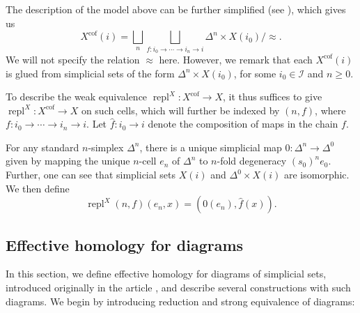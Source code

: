 \documentclass[12pt,a4wide]{article}
\theoremstyle{plain}
\theoremstyle{definition}
\newcommand{\cofr}{\mathrm{cof}}
\newcommand{\repl}{\mathop\mathrm{repl}}
\newcommand{\stdsimp}[1]{\Delta^{#1}}
\renewcommand\:{\colon}
\newcommand{\dX}{X}
\newcommand{\icat}{\mathcal I}
\begin{document}
The description of the model above can be further simplified (see \cite{dugger}), which gives us
\[
\dX^{\cofr} (i) = \bigsqcup_{n} \bigsqcup_{f\:i_0\to \cdots \to i_n\to i} \stdsimp{n} \times \dX(i_0)  / {\approx}.
\]
We will not specify the relation $\approx$ here. However, we remark that each $\dX^{\cofr} (i)$ is glued from simplicial sets of the form $\stdsimp{n} \times \dX(i_0)$, for some $i_0 \in \icat$ and $n \geq 0$. 

To describe the weak equivalence $\repl^{\dX}\:\dX^\cofr \to \dX$, it thus suffices to give  $\repl^{\dX}\:\dX^\cofr \to \dX$ on such cells, which will further be indexed by $(n, f)$, where $f\:i_0\to \cdots \to i_n\to i$. Let $\widehat{f}\: i_0 \to i $ denote the composition of maps in the chain $f$.

For any standard $n$-simplex $\stdsimp{n}$, there is a unique simplicial map $0\colon\stdsimp{n} \to \stdsimp{0}$ given by mapping the unique $n$-cell $e_n$ of $\stdsimp{n}$ to $n$-fold degeneracy $(s_0)^n e_0$. Further, one can see that simplicial sets $\dX(i)$ and $\stdsimp{0} \times \dX(i)$ are isomorphic. We  then define
\[
{\repl}^{\dX} (n,f) (e_n, x) = (0(e_n), \widehat{f}(x)).
\]



\subsection{Effective homology for diagrams}\label{sec:effdiagrams}
In this section, we define effective homology for diagrams of simplicial sets, introduced originally in the article \cite{filak}, and describe several constructions with such diagrams. We begin by introducing reduction and strong equivalence of diagrams:
\end{document}
